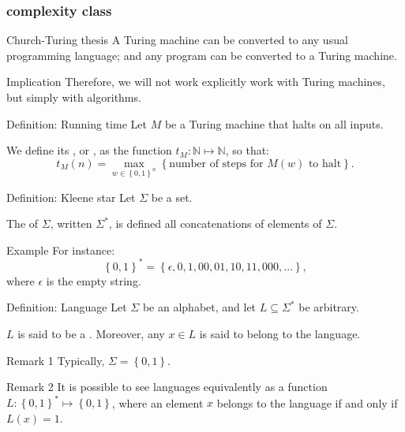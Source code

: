 \documentclass[a4paper]{article}
\begin{document}
\subsubsection{ complexity class}

\begin{parag}{Church-Turing thesis}
    A Turing machine can be converted to any usual programming language; and any program can be converted to a Turing machine.

    \begin{subparag}{Implication}
        Therefore, we will not work explicitly work with Turing machines, but simply with algorithms.
    \end{subparag}
\end{parag}

\begin{parag}{Definition: Running time}
    Let $M$ be a Turing machine that halts on all inputs.

    We define its , or , as the function $t_M: \mathbb{N} \mapsto \mathbb{N}$, so that: 
    \[t_M\left(n\right) = \max_{w \in \left\{0, 1\right\}^n} \left\{\text{number of steps for $M\left(w\right)$ to halt}\right\}.\]
\end{parag}

\begin{parag}{Definition: Kleene star}
    Let $\Sigma$ be a set.

    The  of $\Sigma$, written $\Sigma^*$, is defined all concatenations of elements of $\Sigma$. 

    \begin{subparag}{Example}
        For instance: 
        \[\left\{0, 1\right\}^* = \left\{\epsilon, 0, 1, 00, 01, 10, 11, 000, \ldots\right\},\]
        where $\epsilon$ is the empty string.
    \end{subparag}
\end{parag}

\begin{parag}{Definition: Language}
    Let $\Sigma$ be an alphabet, and let $L \subseteq \Sigma^*$ be arbitrary.

    $L$ is said to be a . Moreover, any $x \in L$ is said to belong to the language.

    \begin{subparag}{Remark 1}
        Typically, $\Sigma = \left\{0, 1\right\}$.
    \end{subparag}

    \begin{subparag}{Remark 2}
        It is possible to see languages equivalently as a function $L: \left\{0, 1\right\}^* \mapsto \left\{0, 1\right\}$, where an element $x$ belongs to the language if and only if $L\left(x\right) = 1$.
    \end{subparag}
\end{parag}
\end{document}
